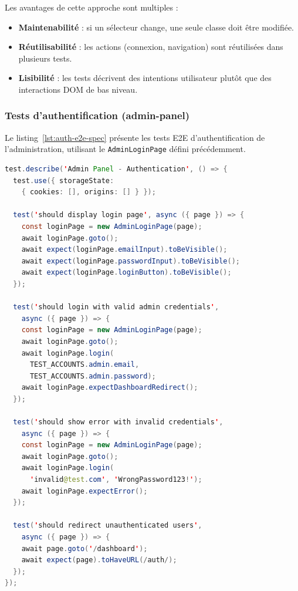 Les avantages de cette approche sont multiples :
\begin{itemize}
  \item \textbf{Maintenabilité} : si un sélecteur change, une seule classe doit
        être modifiée.
  \item \textbf{Réutilisabilité} : les actions (connexion, navigation) sont
        réutilisées dans plusieurs tests.
  \item \textbf{Lisibilité} : les tests décrivent des intentions utilisateur
        plutôt que des interactions DOM de bas niveau.
\end{itemize}

\subsubsection{Tests d'authentification (admin-panel)}

Le listing~\ref{lst:auth-e2e-spec} présente les tests E2E d'authentification de
l'administration, utilisant le \texttt{AdminLoginPage} défini précédemment.

\begin{lstlisting}[language=Java, caption={Tests E2E d'authentification -- auth.spec.ts}, label={lst:auth-e2e-spec}]
test.describe('Admin Panel - Authentication', () => {
  test.use({ storageState:
    { cookies: [], origins: [] } });

  test('should display login page', async ({ page }) => {
    const loginPage = new AdminLoginPage(page);
    await loginPage.goto();
    await expect(loginPage.emailInput).toBeVisible();
    await expect(loginPage.passwordInput).toBeVisible();
    await expect(loginPage.loginButton).toBeVisible();
  });

  test('should login with valid admin credentials',
    async ({ page }) => {
    const loginPage = new AdminLoginPage(page);
    await loginPage.goto();
    await loginPage.login(
      TEST_ACCOUNTS.admin.email,
      TEST_ACCOUNTS.admin.password);
    await loginPage.expectDashboardRedirect();
  });

  test('should show error with invalid credentials',
    async ({ page }) => {
    const loginPage = new AdminLoginPage(page);
    await loginPage.goto();
    await loginPage.login(
      'invalid@test.com', 'WrongPassword123!');
    await loginPage.expectError();
  });

  test('should redirect unauthenticated users',
    async ({ page }) => {
    await page.goto('/dashboard');
    await expect(page).toHaveURL(/auth/);
  });
});
\end{lstlisting}


